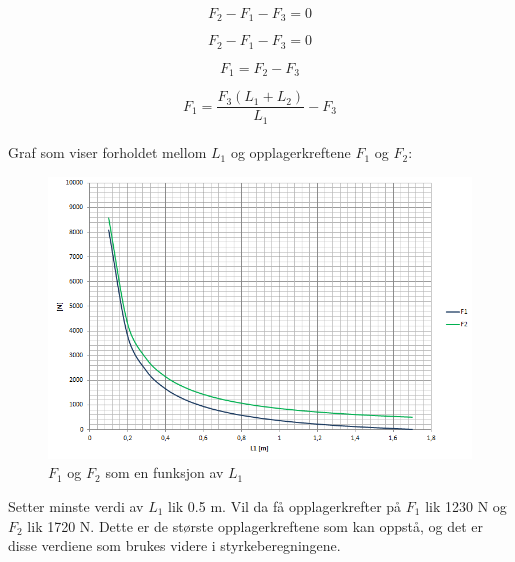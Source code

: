 \begin{equation}
F_2-F_1-F_3=0
\end{equation}

\begin{equation}
F_2-F_1-F_3=0
\end{equation}
 
\begin{equation}
F_1=F_2-F_3
\end{equation}


\begin{equation}
F_1=\frac{F_3(L_1+L_2)}{L_1}-F_3
\end{equation} \\

Graf som viser forholdet mellom $L_1$ og opplagerkreftene $F_1$ og $F_2$:

\begin{figure}[H]
\begin{center}
\leavevmode
\includegraphics[width=1.0\textwidth]{images/Bilden_2}
\end{center}
\caption{$F_1$ og $F_2$ som en funksjon av $L_1$}
\label{fig:Krefter}
\end{figure}

Setter minste verdi av $L_1$ lik 0.5 m. Vil da få opplagerkrefter på $F_1$ lik 1230 N og $F_2$ lik 1720 N. Dette er de største opplagerkreftene som kan oppstå, og det er disse verdiene som brukes videre i styrkeberegningene.


